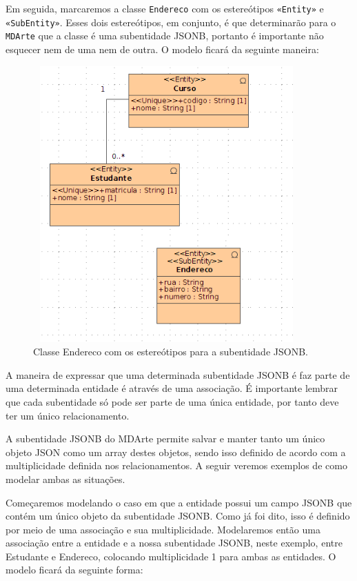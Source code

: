 Em seguida, marcaremos a classe \texttt{Endereco} com os estereótipos
\texttt{«Entity»} e \texttt{«SubEntity»}. Esses dois estereótipos, em conjunto,
é que determinarão para o \texttt{MDArte} que a classe é uma subentidade JSONB,
portanto é importante não esquecer nem de uma nem de outra. O modelo ficará da
seguinte maneira:

\begin{figure}[H]
	\centering
	\includegraphics[width=290pt,height=300pt]{files/imgs/tutorial-mdarte-jsonb-0002.png}
	\caption{Classe Endereco com os estereótipos para a subentidade JSONB.}
	\label{camada_dominio_endereco_estereotipos}
\end{figure}

A maneira de expressar que uma determinada subentidade JSONB é faz parte de uma
determinada entidade é através de uma associação. É importante lembrar que cada
subentidade só pode ser parte de uma única entidade, por tanto deve ter um único
relacionamento.

A subentidade JSONB do MDArte permite salvar e manter tanto um único objeto JSON
como um array destes objetos, sendo isso definido de acordo com a
multiplicidade definida nos relacionamentos. A seguir veremos exemplos de como
modelar ambas as situações.

Começaremos modelando o caso em que a entidade possui um campo JSONB que contém
um único objeto da subentidade JSONB. Como já foi dito, isso é definido por meio
de uma associação e sua multiplicidade. Modelaremos então uma associação entre a
entidade e a nossa subentidade JSONB, neste exemplo, entre Estudante e Endereco,
colocando multiplicidade 1 para ambas as entidades. O modelo ficará da seguinte
forma:

